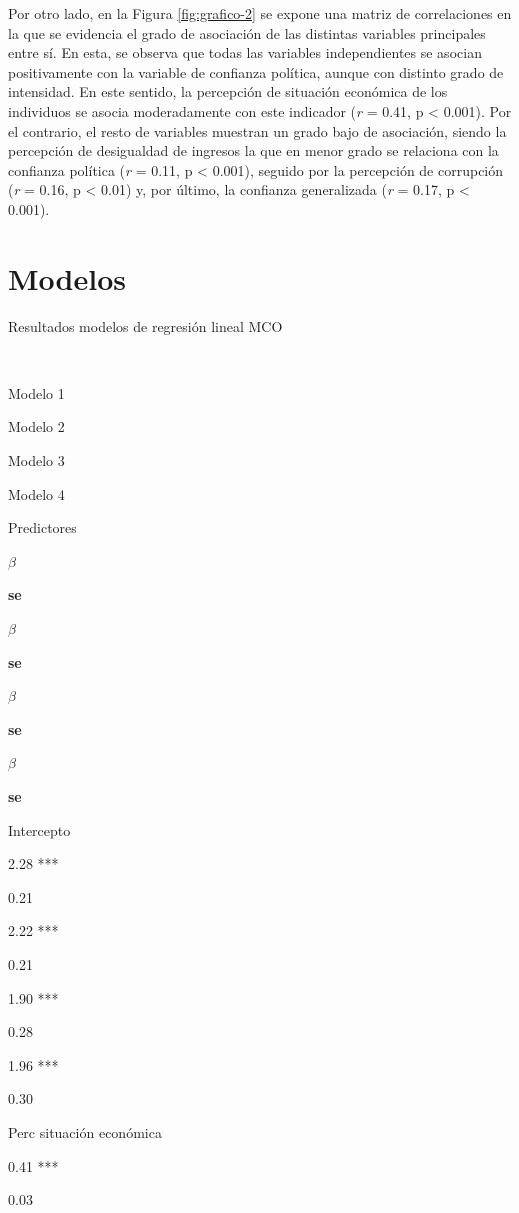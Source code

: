 \documentclass[12pt,twoside]{templates/facsothesis}
\begin{document}
Por otro lado, en la Figura \ref{fig:grafico-2} se expone una matriz de correlaciones en la que se evidencia el grado de asociación de las distintas variables principales entre sí. En esta, se observa que todas las variables independientes se asocian positivamente con la variable de confianza política, aunque con distinto grado de intensidad. En este sentido, la percepción de situación económica de los individuos se asocia moderadamente con este indicador (\emph{r} = 0.41, p \textless{} 0.001). Por el contrario, el resto de variables muestran un grado bajo de asociación, siendo la percepción de desigualdad de ingresos la que en menor grado se relaciona con la confianza política (\emph{r} = 0.11, p \textless{} 0.001), seguido por la percepción de corrupción (\emph{r} = 0.16, p \textless{} 0.01) y, por último, la confianza generalizada (\emph{r} = 0.17, p \textless{} 0.001).

\section{Modelos}\label{modelos}

\label{tab:tabla-regresiones} Resultados modelos de regresión lineal MCO

~

Modelo 1

Modelo 2

Modelo 3

Modelo 4

Predictores

\textbf{\(\beta\)}

\textbf{se}

\textbf{\(\beta\)}

\textbf{se}

\textbf{\(\beta\)}

\textbf{se}

\textbf{\(\beta\)}

\textbf{se}

Intercepto

2.28 ***

0.21

2.22 ***

0.21

1.90 ***

0.28

1.96 ***

0.30

Perc situación económica

0.41 ***

0.03
\end{document}
